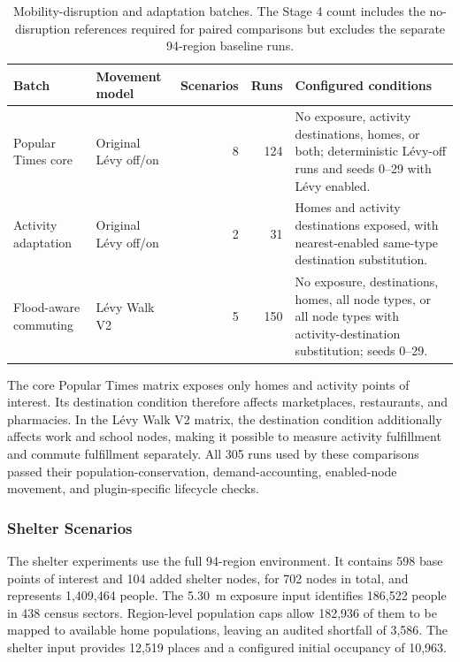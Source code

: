 \begin{table}[ht]
\centering
\footnotesize
\caption{Mobility-disruption and adaptation batches. The Stage 4 count includes the no-disruption references required for paired comparisons but excludes the separate 94-region baseline runs.}
\label{tbl:mobility_disruption_batches}
\begin{tabularx}{\linewidth}{@{}llrrX@{}}
\toprule
\textbf{Batch} & \textbf{Movement model} & \textbf{Scenarios} & \textbf{Runs} & \textbf{Configured conditions} \\
\midrule
Popular Times core
    & Original L\'evy off/on & 8 & 124
    & No exposure, activity destinations, homes, or both; deterministic L\'evy-off runs and seeds 0--29 with L\'evy enabled. \\
Activity adaptation
    & Original L\'evy off/on & 2 & 31
    & Homes and activity destinations exposed, with nearest-enabled same-type destination substitution. \\
Flood-aware commuting
    & L\'evy Walk V2 & 5 & 150
    & No exposure, destinations, homes, all node types, or all node types with activity-destination substitution; seeds 0--29. \\
\bottomrule
\end{tabularx}
\end{table}

The core Popular Times matrix exposes only homes and activity points of interest. Its destination condition therefore affects marketplaces, restaurants, and pharmacies. In the L\'evy Walk V2 matrix, the destination condition additionally affects work and school nodes, making it possible to measure activity fulfillment and commute fulfillment separately. All 305 runs used by these comparisons passed their population-conservation, demand-accounting, enabled-node movement, and plugin-specific lifecycle checks.

\subsubsection{Shelter Scenarios}

The shelter experiments use the full 94-region environment. It contains 598 base points of interest and 104 added shelter nodes, for 702 nodes in total, and represents 1,409,464 people. The 5.30~m exposure input identifies 186,522 people in 438 census sectors. Region-level population caps allow 182,936 of them to be mapped to available home populations, leaving an audited shortfall of 3,586. The shelter input provides 12,519 places and a configured initial occupancy of 10,963.

